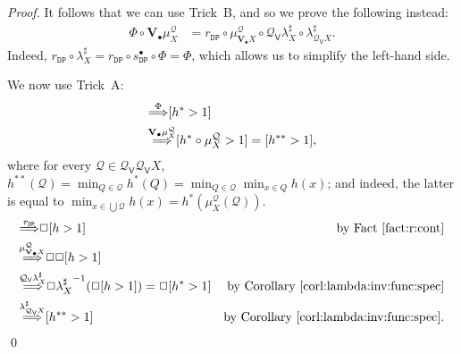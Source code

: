 \documentclass[preprint,12pt]{elsarticle}
\newcommand\Demon{{\mathtt{D}}}
\newcommand\Nature{{\mathtt{P}}}
\newcommand\DN{{\Demon\Nature}}
\newcommand\invto[1]{{\buildrel {#1} \over\Longrightarrow}}
\newcommand\Smyth{{\mathcal Q}}
\newcommand\Vt{\mathsf{V}}
\newcommand\SV{\Smyth_{\Vt}}
\newcommand\Val{{\mathbf V}}
\begin{document}
\begin{proof}
  It follows that we can use Trick~B, and so we prove the following
  instead:
  \begin{align*}
    \Phi \circ \Val_\bullet {\mu^\Smyth_X}
    & = r_\DN \circ  \mu^\Smyth_{\Val_\bullet X} \circ \SV {\lambda^\sharp_X} \circ \lambda^\sharp_{\SV X}.
  \end{align*}
  Indeed,
  $r_\DN \circ {\lambda^\sharp_X} = r_\DN \circ s_\DN^\bullet \circ \Phi =
  \Phi$, which allows us to simplify the left-hand side.

  We now use Trick~A:
  \begin{align*}
    [h > 1]
    & \invto{\Phi} [h^* > 1] \\
    & \invto{\Val_\bullet {\mu^\Smyth_X}}
      [h^* \circ \mu^\Smyth_X > 1] = [h^{**} > 1],
  \end{align*}
  where for every $\mathcal Q \in \SV {\SV X}$,
  $h^{**} (\mathcal Q) = \min_{Q \in \mathcal Q} h^* (Q) = \min_{Q \in
    \mathcal Q} \min_{x \in Q} h (x)$; and indeed, the latter is equal
  to
  $\min_{x \in \bigcup \mathcal Q} h (x) = h^* (\mu^\Smyth_X (\mathcal
  Q))$.
  \begin{align*}
    [h > 1]
    & \invto{r_\DN}
      \Box {[h > 1]}
    & \text{by Fact~\ref{fact:r:cont}} \\
    & \invto{\mu^\Smyth_{\Val_\bullet X}}
      \Box {\Box {[h > 1]}} \\
    & \invto{\SV {{\lambda^\sharp_X}}}
      \Box {{\lambda^\sharp_X}^{-1} (\Box {[h > 1]})}
      = \Box {[h^* > 1]}
    & \text{by Corollary~\ref{corl:lambda:inv:func:spec}}\\
    & \invto{\lambda^\sharp_{\SV X}}
      [h^{**} > 1]
    & \text{by Corollary~\ref{corl:lambda:inv:func:spec}}.
  \end{align*}
  \qed
\end{proof}
\end{document}
